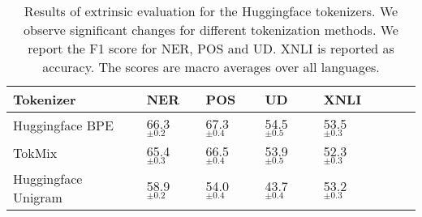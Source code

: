 \begin{table}
\centering
\caption{Results of extrinsic evaluation for the Huggingface tokenizers. We observe significant changes for different tokenization methods. We report the F1 score for NER, POS and UD. XNLI is reported as accuracy. The scores are macro averages over all languages.}
\label{tab:in_lang_avg_20l}
    \small
    \begin{tabular}{llllllll}
    \toprule
    Tokenizer    &               NER &               POS &                UD &              XNLI \\
    \midrule
    Huggingface BPE       &  66.3 $_{\pm0.2}$ &  67.3 $_{\pm0.4}$ &  54.5 $_{\pm0.5}$ &  53.5 $_{\pm0.3}$ \\
    TokMix    &  65.4 $_{\pm0.3}$ &  66.5 $_{\pm0.4}$ &  53.9 $_{\pm0.5}$ &  52.3 $_{\pm0.3}$ \\
    Huggingface Unigram   &  58.9 $_{\pm0.2}$ &  54.0 $_{\pm0.4}$ &  43.7 $_{\pm0.4}$ &  53.2 $_{\pm0.3}$ \\
    \bottomrule
    \end{tabular}
\end{table}